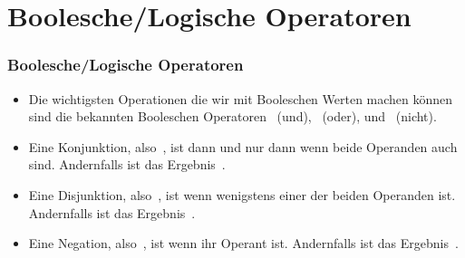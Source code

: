 \documentclass[aspectratio=169,mathserif,notheorems]{beamer}%
\begin{document}
\section{Boolesche/Logische Operatoren}%
%
\begin{frame}[t]%
\frametitle{Boolesche/Logische Operatoren}%
\begin{itemize}%
\item Die wichtigsten Operationen die wir mit Booleschen Werten machen können sind die bekannten Booleschen Operatoren ~(und), ~(oder), und ~(nicht).
%
\item<2-> Eine Konjunktion, also~, ist  dann und nur dann wenn beide Operanden auch  sind. Andernfalls ist das Ergebnis~.%
%
\item<3-> Eine Disjunktion, also~, ist  wenn wenigstens einer der beiden Operanden  ist. Andernfalls ist das Ergebnis~.%
%
\item<4-> Eine Negation, also~, ist  wenn ihr Operant  ist. Andernfalls ist das Ergebnis~.%
%
\end{itemize}%
%
%
%
%
%
%
%
\end{frame}%
\end{document}
